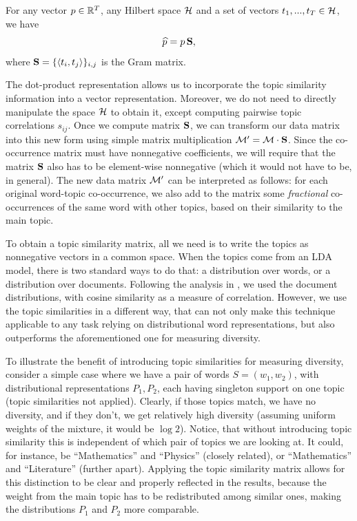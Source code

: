 \ber
For any vector $p\in{\mathbb R}^T$, any Hilbert space ${\mathcal H}$ and a set of
vectors $t_1,...,t_T\in{\mathcal H}$, we have 
\[\widehat{p} = p\operatorname{\mathbf{S}},\]
where $\operatorname{\mathbf{S}}=\{\langle t_i,t_j\rangle\}_{i,j}$ is the Gram matrix.
\eer

The dot-product representation allows us to incorporate the topic
similarity information into a vector representation. Moreover, we do
not need to directly manipulate the space ${\mathcal H}$ to obtain it, except
computing pairwise topic correlations $s_{ij}$. Once we compute matrix
$\operatorname{\mathbf{S}}$, we can transform our data matrix into this new form using simple
matrix multiplication ${\mathcal M}'={\mathcal M}\cdot \operatorname{\mathbf{S}}$. Since the co-occurrence matrix
must have nonnegative coefficients, we will require that the matrix
$\operatorname{\mathbf{S}}$ also has to be element-wise nonnegative (which it would not
have to be, in general). The new data matrix ${\mathcal M}'$ can be interpreted
as follows: for each original word-topic co-occurrence, we also add to
the matrix some {\em fractional} co-occurrences of the same word with
other topics, based on their similarity to the main topic.

To obtain a topic similarity matrix, all we need is to write
the topics as nonnegative vectors in a common space. When the topics
come from an LDA model, there is two standard ways to do that: a
distribution over words, or a distribution over documents. Following
the analysis in \cite{bache:2013}, we used the document distributions,
with cosine similarity as a measure of correlation. However, we use the
topic similarities in a different way, that can not only make this
technique applicable to any task relying on distributional word
representations, but also outperforms the aforementioned one for
measuring diversity.

To illustrate the benefit of introducing topic similarities for
measuring diversity, consider a simple case where we have a pair of words
$S=(w_1,w_2)$, with distributional representations $P_1,P_2$, each having
singleton support on one topic (topic similarities not
applied). Clearly, if those topics match, we 
have no diversity, and if they don't, we get relatively high diversity
(assuming uniform weights of the mixture, it would be $\log 2$). Notice, that without introducing topic similarity this is
independent of which pair of topics we are looking at. It could, for
instance, be ``Mathematics'' and ``Physics'' (closely related), or
``Mathematics'' and ``Literature'' (further apart).  Applying the
topic similarity matrix allows for this distinction to be clear and properly
reflected in the results, because the weight from the main topic has
to be redistributed among similar ones, making the distributions $P_1$
and $P_2$ more comparable.
  
